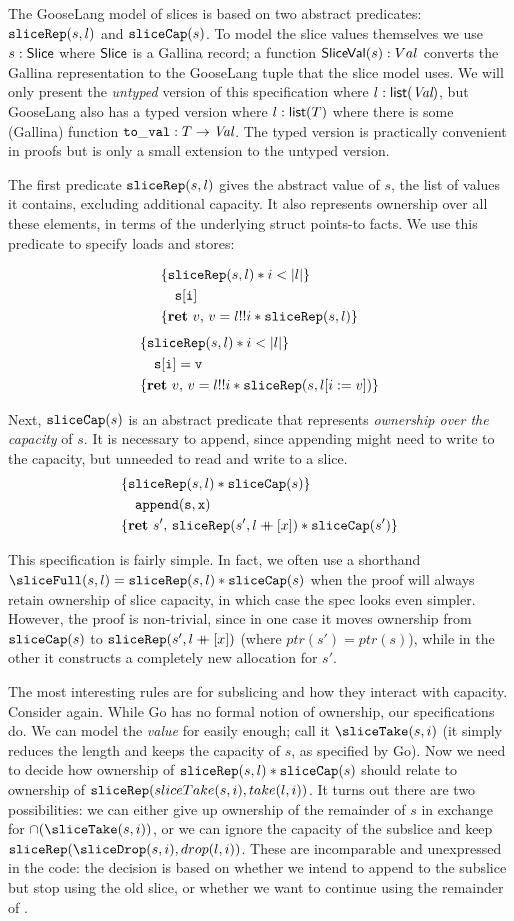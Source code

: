 The GooseLang model of slices is based on two abstract predicates:
$\mathtt{sliceRep}(s, l)$ and $\mathtt{sliceCap}(s)$. To model the slice values
themselves we use $s : \textsf{\upshape Slice}$ where $\textsf{\upshape Slice}$ is a Gallina record; a
function $\textsf{\upshape SliceVal}(s) : Val$ converts the Gallina representation to
the GooseLang tuple that the slice model uses. We will only present the
\emph{untyped} version of this specification where $l : \textsf{\upshape list}(\textit{Val})$, but
GooseLang also has a typed version where $l : \textsf{\upshape list}(T)$ where there is
some (Gallina) function $\mathtt{to\_val} : T \to \textit{Val}$. The typed version is
practically convenient in proofs but is only a small extension to the
untyped version.

The first predicate $\mathtt{sliceRep}(s, l)$ gives the abstract value of
$s$, the list of values it contains, excluding additional capacity. It
also represents ownership over all these elements, in terms of the
underlying struct points-to facts. We use this predicate to specify
loads and stores:

\[
  \hoareV{\sliceRep(s, l) * i < |l|}%
{\mathtt{s[i]}}%
{\Ret{v} v = l !! i * \sliceRep(s, l)}
\]
\[
  \hoareV{\sliceRep(s, l) * i < |l|}%
 {\mathtt{s[i] = v}}%
{\Ret{v} v = l !! i * \sliceRep(s, l[i := v])}
\]

Next, $\mathtt{sliceCap}(s)$ is an abstract predicate that represents
\emph{ownership over the capacity} of $s$. It is necessary to append,
since appending might need to write to the capacity, but unneeded to
read and write to a slice.
\[
\hoareV{\sliceRep(s, l) * \sliceCap(s)}%
{\mathtt{append(s, x)}}%
{\Ret{s'} \sliceRep(s', l \lappend [x]) * \sliceCap(s')}
\]


This specification is fairly simple. In fact, we often use a shorthand
$\sliceFull(s, l) = \sliceRep(s, l) * \sliceCap(s)$ when the proof will
always retain ownership of slice capacity, in which case the spec looks
even simpler. However, the proof is non-trivial, since in one case it
moves ownership from $\mathtt{sliceCap}(s)$ to $\mathtt{sliceRep}(s', l \mathbin{+\mkern-10mu+} [x])$
(where $ptr(s') = ptr(s)$), while in the other it constructs a
completely new allocation for $s'$.


The most interesting rules are for subslicing and how they interact with
capacity. Consider  again. While Go has no formal
notion of ownership, our specifications do. We can model the
\emph{value} for  easily enough; call it
$\sliceTake(s, i)$ (it simply reduces the length and keeps the capacity
of $s$, as specified by Go). Now we need to decide how ownership of
$\mathtt{sliceRep}(s, l) * \mathtt{sliceCap}(s)$ should relate to ownership of
$\mathtt{sliceRep}(sliceTake(s, i), take(l, i))$. It turns out there are two
possibilities: we can either give up ownership of the remainder of $s$
in exchange for $\cap(\sliceTake(s, i))$, or we can ignore the
capacity of the subslice and keep
$\sliceRep(\sliceDrop(s, i), drop(l, i))$. These are incomparable and
unexpressed in the code: the decision is based on whether we intend to
append to the subslice but stop using the old slice, or whether we want
to continue using the remainder of .

